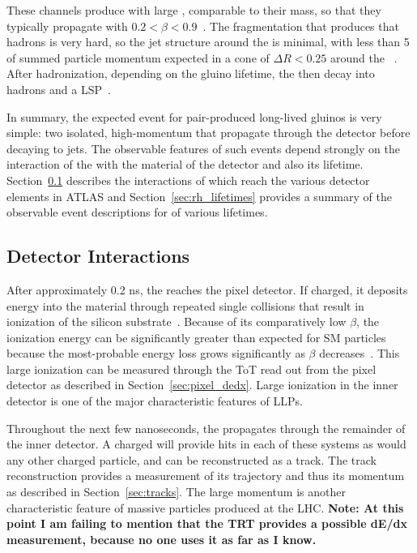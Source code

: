 These channels produce \rhadrons with large \pt, comparable to their mass, so that they typically propagate with $0.2 < \beta < 0.9$~\cite{rhad_atlas}.
The fragmentation that produces that hadrons is very hard, so the jet structure around the \rhadron is minimal, with less than 5 \GeV of summed particle momentum expected in a cone of $\Delta R < 0.25$ around the \rhadron~\cite{rhad_atlas}.
After hadronization, depending on the gluino lifetime, the \rhadrons then decay into hadrons and a \ac{LSP}~\cite{rhadron}.

In summary, the expected event for pair-produced long-lived gluinos is very simple: two isolated, high-momentum \rhadrons that propagate through the detector before decaying to jets.
The observable features of such events depend strongly on the interaction of the \rhadron with the material of the detector and also its lifetime.
Section~\ref{sec:rh_interactions} describes the interactions of \rhadrons which reach the various detector elements in ATLAS and Section~\ref{sec:rh_lifetimes} provides a summary of the observable event descriptions for \rhadrons of various lifetimes.

\subsection{Detector Interactions}
\label{sec:rh_interactions}

After approximately 0.2 ns, the \rhadron reaches the pixel detector. If charged, it deposits energy into the material through repeated single collisions that result in ionization of the silicon substrate~\cite{pdg}. 
Because of its comparatively low $\beta$, the ionization energy can be significantly greater than expected for \ac{SM} particles because the most-probable energy loss grows significantly as $\beta$ decreases~\cite{pdg}.
This large ionization can be measured through the \ac{ToT} read out from the pixel detector as described in Section~\ref{sec:pixel_dedx}.
Large ionization in the inner detector is one of the major characteristic features of \acp{LLP}.

Throughout the next few nanoseconds, the \rhadron propagates through the remainder of the inner detector.
A charged \rhadron will provide hits in each of these systems as would any other charged particle, and can be reconstructed as a track.
The track reconstruction provides a measurement of its trajectory and thus its momentum as described in Section~\ref{sec:tracks}.
The large momentum is another characteristic feature of massive particles produced at the \ac{LHC}.
\textbf{Note: At this point I am failing to mention that the TRT provides a possible dE/dx measurement, because no one uses it as far as I know.}

